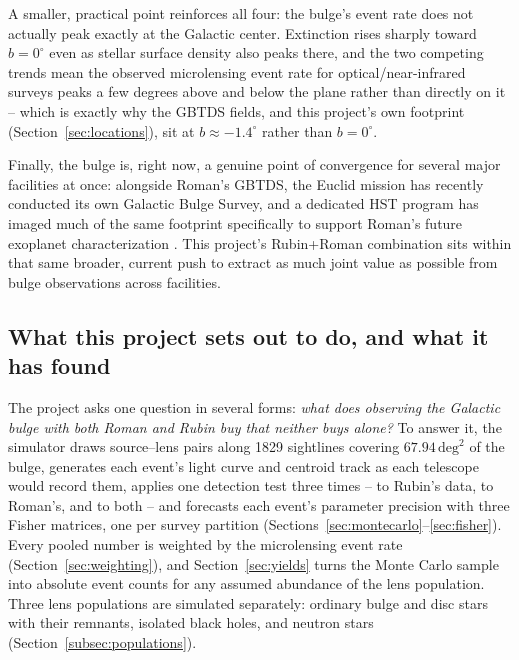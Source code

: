 \documentclass[english,10pt,a4paper]{article}
\begin{document}
	A smaller, practical point reinforces all four: the bulge's event rate does not actually peak exactly at the Galactic center. Extinction rises sharply toward $b=0^{\circ}$ even as stellar surface density also peaks there, and the two competing trends mean the observed microlensing event rate for optical/near-infrared surveys peaks a few degrees above and below the plane rather than directly on it \cite{Terry2026HST,KiragaPaczynski1994} -- which is exactly why the GBTDS fields, and this project's own footprint (Section~\ref{sec:locations}), sit at $b\approx-1.4^{\circ}$ rather than $b=0^{\circ}$.
	
	Finally, the bulge is, right now, a genuine point of convergence for several major facilities at once: alongside Roman's GBTDS, the Euclid mission has recently conducted its own Galactic Bulge Survey, and a dedicated HST program has imaged much of the same footprint specifically to support Roman's future exoplanet characterization \cite{Terry2026HST}. This project's Rubin+Roman combination sits within that same broader, current push to extract as much joint value as possible from bulge observations across facilities.
	
	\subsection{What this project sets out to do, and what it has found}
	\label{subsec:aims}

	The project asks one question in several forms: \emph{what does observing the Galactic bulge with both Roman and Rubin buy that neither buys alone?} To answer it, the simulator draws source--lens pairs along 1829 sightlines covering $67.94\,\mathrm{deg}^2$ of the bulge, generates each event's light curve and centroid track as each telescope would record them, applies one detection test three times -- to Rubin's data, to Roman's, and to both -- and forecasts each event's parameter precision with three Fisher matrices, one per survey partition (Sections~\ref{sec:montecarlo}--\ref{sec:fisher}). Every pooled number is weighted by the microlensing event rate (Section~\ref{sec:weighting}), and Section~\ref{sec:yields} turns the Monte Carlo sample into absolute event counts for any assumed abundance of the lens population. Three lens populations are simulated separately: ordinary bulge and disc stars with their remnants, isolated black holes, and neutron stars (Section~\ref{subsec:populations}).
\end{document}
